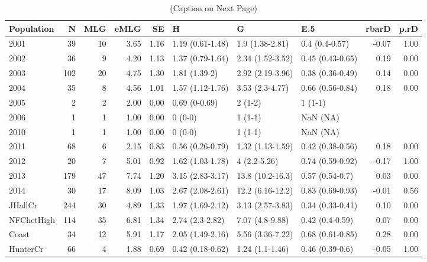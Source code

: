 \documentclass[double,11pt]{beavtex}
\begin{document}
  \begin{table}
  \centering
  \caption[Genotypic diversity metrics or populations of
  textit{Phytophthora ramorum} sampled in Curry County, Oregon between 2001-14
  causing sudden oak death.
  ]{(Caption on Next Page)} 
  \label{tab:ramtabS3}
  \begin{tabular}{lrrrrlllrr}
    \toprule
  Population & N & MLG & eMLG & SE & H & G & E.5 & rbarD & p.rD \\ 
    \midrule
  2001 &  39 &  10 & 3.65 & 1.16 & 1.19 (0.61-1.48) & 1.9 (1.38-2.81) & 0.4 (0.4-0.57) & -0.07 & 1.00 \\ 
    2002 &  36 &   9 & 4.20 & 1.13 & 1.37 (0.79-1.64) & 2.34 (1.52-3.52) & 0.45 (0.43-0.65) & 0.19 & 0.00 \\ 
    2003 & 102 &  20 & 4.75 & 1.30 & 1.81 (1.39-2) & 2.92 (2.19-3.96) & 0.38 (0.36-0.49) & 0.14 & 0.00 \\ 
    2004 &  35 &   8 & 4.56 & 1.01 & 1.57 (1.12-1.76) & 3.53 (2.3-4.77) & 0.66 (0.56-0.84) & 0.18 & 0.00 \\ 
    2005 &   2 &   2 & 2.00 & 0.00 & 0.69 (0-0.69) & 2 (1-2) & 1 (1-1) &  &  \\ 
    2006 &   1 &   1 & 1.00 & 0.00 & 0 (0-0) & 1 (1-1) & NaN (NA) &  &  \\ 
    2010 &   1 &   1 & 1.00 & 0.00 & 0 (0-0) & 1 (1-1) & NaN (NA) &  &  \\ 
    2011 &  68 &   6 & 2.15 & 0.83 & 0.56 (0.26-0.79) & 1.32 (1.13-1.59) & 0.42 (0.38-0.56) & 0.18 & 0.00 \\ 
    2012 &  20 &   7 & 5.01 & 0.92 & 1.62 (1.03-1.78) & 4 (2.2-5.26) & 0.74 (0.59-0.92) & -0.17 & 1.00 \\ 
    2013 & 179 &  47 & 7.74 & 1.20 & 3.15 (2.83-3.17) & 13.8 (10.2-16.3) & 0.57 (0.54-0.7) & 0.03 & 0.00 \\ 
    2014 &  30 &  17 & 8.09 & 1.03 & 2.67 (2.08-2.61) & 12.2 (6.16-12.2) & 0.83 (0.69-0.93) & -0.01 & 0.56 \\ 
    JHallCr & 244 &  30 & 4.89 & 1.33 & 1.97 (1.69-2.12) & 3.13 (2.57-3.83) & 0.34 (0.33-0.41) & 0.10 & 0.00 \\ 
    NFChetHigh & 114 &  35 & 6.81 & 1.34 & 2.74 (2.3-2.82) & 7.07 (4.8-9.88) & 0.42 (0.4-0.59) & 0.07 & 0.00 \\ 
    Coast &  34 &  12 & 5.91 & 1.17 & 2.05 (1.49-2.16) & 5.56 (3.36-7.22) & 0.68 (0.61-0.85) & 0.28 & 0.00 \\ 
    HunterCr &  66 &   4 & 1.88 & 0.69 & 0.42 (0.18-0.62) & 1.24 (1.1-1.46) & 0.46 (0.39-0.6) & -0.05 & 1.00 \\ 

\end{tabular}
\end{table}
\end{document}
